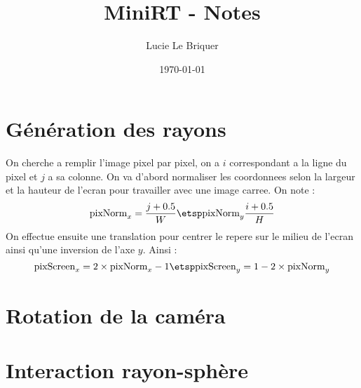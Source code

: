 

\title{\LARGE \textbf{MiniRT} - Notes}
\author{\large Lucie Le Briquer}
\date{\today}


\maketitle
\tableofcontents
\newpage
\section{Génération des rayons}
\begin{center}
\hspace{1cm}
\end{center}
\dd\ni On cherche a remplir l'image pixel par pixel, on a $i$ correspondant a la
ligne du pixel et $j$ a sa colonne. On va d'abord normaliser les coordonnees
selon la largeur et la hauteur de l'ecran pour travailler avec une image carree.
On note :
$$\text{pixNorm}_x=\frac{j + 0.5} W \etsp\text{pixNorm}_y\frac{i + 0.5} H$$
\ni On effectue ensuite une translation pour centrer le repere sur le milieu de
l'ecran ainsi qu'une inversion de l'axe $y$. Ainsi :
$$\text{pixScreen}_x=2 \times\text{pixNorm}_x -1 \etsp \text{pixScreen}_y = 1 -
2\times \text{pixNorm}_y$$


\newpage
\section{Rotation de la caméra}
\newpage
\section{Interaction rayon-sphère}
\newpage
